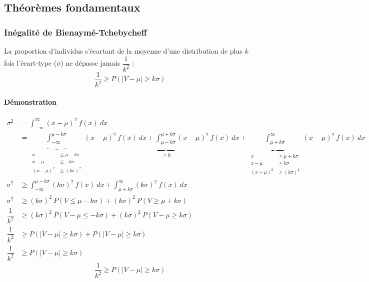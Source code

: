 \subsection{Théorèmes fondamentaux}



\subsubsection{Inégalité de Bienaymé-Tchebycheff}
La proportion d'individus s'écartant de la moyenne d'une distribution de plus $k$ fois l'écart-type ($\sigma$) ne dépasse jamais $\dfrac{1}{k^2}$ :
$$\boxed{\dfrac{1}{k^2} \geq P(|V-\mu|\geq k\sigma)}$$
\paragraph{Démonstration}
\begin{align*}
	\sigma^2 &= \int_{-\infty}^{\infty} (x-\mu)^2\ f(x)\ dx\\
             &= \underbrace{\int_{-\infty}^{\mu-k\sigma}}_{\begin{aligned}x&\leq\mu-k\sigma\\x-\mu&\leq -k\sigma\\(x-\mu)^2&\geq(k\sigma)^2\end{aligned}} (x-\mu)^2\ f(x)\ dx + \underbrace{\int_{\mu-k\sigma}^{\mu+k\sigma}}_{\geq0} (x-\mu)^2\ f(x)\ dx + \underbrace{\int_{\mu+k\sigma}^{\infty}}_{\begin{aligned}x&\geq\mu+k\sigma\\x-\mu&\geq k\sigma\\(x-\mu)^2&\geq(k\sigma)^2\end{aligned}} (x-\mu)^2\ f(x)\ dx\\
    \sigma^2 &\geq \int_{-\infty}^{\mu-k\sigma} (k\sigma)^2\ f(x)\ dx + \int_{\mu+k\sigma}^{\infty} (k\sigma)^2\ f(x)\ dx\\
    \sigma^2 &\geq (k\sigma)^2\ P(V\leq\mu-k\sigma) + (k\sigma)^2\ P(V\geq\mu+k\sigma)\\
    \dfrac{1}{k^2} &\geq (k\sigma)^2\ P(V-\mu\leq-k\sigma) + (k\sigma)^2\ P(V-\mu\geq k\sigma)\\
    \dfrac{1}{k^2} &\geq P(|V-\mu|\geq k\sigma) + P(|V-\mu|\geq k\sigma)\\
    \dfrac{1}{k^2} &\geq P(|V-\mu|\geq k\sigma)
\end{align*}
$$\boxed{\dfrac{1}{k^2} \geq P(|V-\mu|\geq k\sigma)}$$





